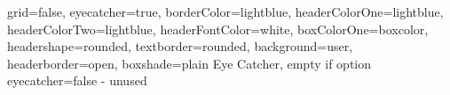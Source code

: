 \documentclass[a0paper,portrait]{baposter}      %
\begin{document}
\begin{poster}{                                                                                     %
	grid=false,                                                                                     %
	eyecatcher=true,                                                                                %
	borderColor=lightblue,                                                                          %
	headerColorOne=lightblue,                                                                       %
	headerColorTwo=lightblue,                                                                       %
	headerFontColor=white,                                                                          %
	boxColorOne=boxcolor,                                                                           %
    headershape=rounded,                                                                            %
	textborder=rounded,                                                                             %
	background=user,                                                                                %
	headerborder=open,                                                                              %
    boxshade=plain                                                                                  %
}                                                                                                   %
{                                                                            %
	Eye Catcher, empty if option eyecatcher=false - unused                   %
}                                                                            %
%
{\sf\bf
}
\end{poster}
\end{document}
